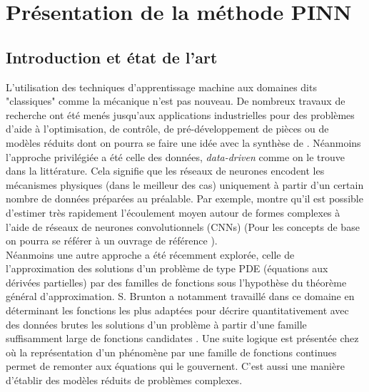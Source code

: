 \section{Présentation de la méthode PINN}

\subsection{Introduction et état de l'art}

L'utilisation des techniques d'apprentissage machine aux domaines dits "classiques" comme la mécanique n'est pas nouveau. De nombreux travaux de recherche ont été menés jusqu'aux applications industrielles pour des problèmes d'aide à l'optimisation, de contrôle, de pré-développement de pièces ou de modèles réduits dont on pourra se faire une idée avec la synthèse de \cite{bruntonMachineLearningFluid2019a}. Néanmoins l'approche privilégiée a été celle des données, \textit{data-driven} comme on le trouve dans la littérature. Cela signifie que les réseaux de neurones encodent les mécanismes physiques (dans le meilleur des cas) uniquement à partir d'un certain nombre de données préparées au préalable. Par exemple,  \cite{guoConvolutionalNeuralNetworks2016} montre qu'il est possible d'estimer très rapidement l'écoulement moyen autour de formes complexes à l'aide de réseaux de neurones convolutionnels (CNNs) (Pour les concepts de base on pourra se référer à un ouvrage de référence \cite{goodfellowDeepLearning2016a}). \\

Néanmoins une autre approche a été récemment explorée, celle de l'approximation des solutions d'un problème de type PDE (équations aux dérivées partielles) par des familles de fonctions sous l'hypothèse du théorème général d'approximation. S. Brunton a notamment travaillé dans ce domaine en déterminant les fonctions les plus adaptées pour décrire quantitativement avec des données brutes les solutions d'un problème à partir d'une famille suffisamment large de fonctions candidates \cite{bruntonDiscoveringGoverningEquations2016}. Une suite logique est présentée chez \cite{corbettaApplicationSparseIdentification} où la représentation d'un phénomène par une famille de fonctions continues permet de remonter aux équations qui le gouvernent. C'est aussi une manière d'établir des modèles réduits de problèmes complexes. \\

